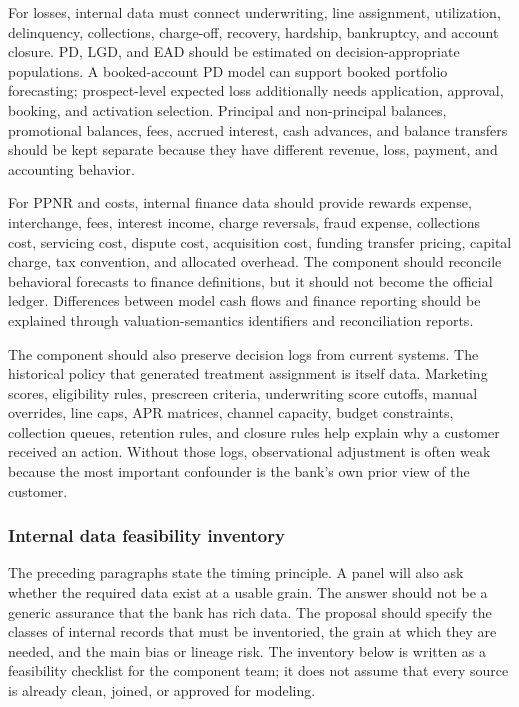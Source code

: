 \documentclass[11pt]{article}
\newcommand{\1}{\mathbf{1}}
\begin{document}
For losses, internal data must connect underwriting, line assignment,
utilization, delinquency, collections, charge-off, recovery, hardship,
bankruptcy, and account closure. PD, LGD, and EAD should be estimated on
decision-appropriate populations. A booked-account PD model can support booked
portfolio forecasting; prospect-level expected loss additionally needs
application, approval, booking, and activation selection. Principal and
non-principal balances, promotional balances, fees, accrued interest, cash
advances, and balance transfers should be kept separate because they have
different revenue, loss, payment, and accounting behavior.

For PPNR and costs, internal finance data should provide rewards expense,
interchange, fees, interest income, charge reversals, fraud expense,
collections cost, servicing cost, dispute cost, acquisition cost, funding
transfer pricing, capital charge, tax convention, and allocated overhead. The
component should reconcile behavioral forecasts to finance definitions, but it
should not become the official ledger. Differences between model cash flows and
finance reporting should be explained through valuation-semantics identifiers
and reconciliation reports.

The component should also preserve decision logs from current systems. The
historical policy that generated treatment assignment is itself data. Marketing
scores, eligibility rules, prescreen criteria, underwriting score cutoffs,
manual overrides, line caps, APR matrices, channel capacity, budget constraints,
collection queues, retention rules, and closure rules help explain why a
customer received an action. Without those logs, observational adjustment is
often weak because the most important confounder is the bank's own prior view
of the customer.

\subsubsection{Internal data feasibility inventory}
\label{subsec:internal-data-feasibility}

The preceding paragraphs state the timing principle. A panel will also ask
whether the required data exist at a usable grain. The answer should not be a
generic assurance that the bank has rich data. The proposal should specify the
classes of internal records that must be inventoried, the grain at which they
are needed, and the main bias or lineage risk. The inventory below is written
as a feasibility checklist for the component team; it does not assume that
every source is already clean, joined, or approved for modeling.
\end{document}
